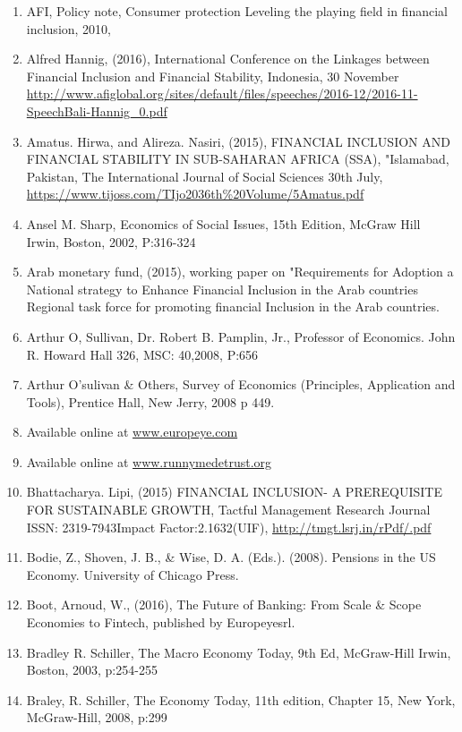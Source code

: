\documentclass[10pt,a4paper]{report}
\begin{document}
	\begin{english}
\begin{enumerate}
	\item AFI, Policy note, Consumer protection Leveling the playing field in financial inclusion, 2010,
	\item Alfred Hannig, (2016), International Conference on the Linkages between Financial Inclusion and Financial Stability, Indonesia, 30 November \url{http://www.afiglobal.org/sites/default/files/speeches/2016-12/2016-11-SpeechBali-Hannig_0.pdf}
	\item Amatus. Hirwa, and Alireza. Nasiri, (2015), FINANCIAL INCLUSION AND FINANCIAL STABILITY IN SUB-SAHARAN AFRICA (SSA), "Islamabad, Pakistan, The International Journal of Social Sciences 30th July, \url{https://www.tijoss.com/TIjo2036th%20Volume/5Amatus.pdf}
	\item Ansel M. Sharp, Economics of Social Issues, 15th Edition, McGraw Hill Irwin, Boston, 2002, P:316-324
	\item Arab monetary fund, (2015), working paper on "Requirements for Adoption a National strategy to Enhance Financial Inclusion in the Arab countries Regional task force for promoting financial Inclusion in the Arab countries.
	\item Arthur O, Sullivan, Dr. Robert B. Pamplin, Jr., Professor of Economics. John R. Howard Hall 326, MSC: 40,2008, P:656
	\item Arthur O'sulivan \& Others, Survey of Economics (Principles, Application and Tools), Prentice Hall, New Jerry, 2008 p 449.
	\item Available online at \url{www.europeye.com}
	\item Available online at \url{www.runnymedetrust.org}
	\item Bhattacharya. Lipi, (2015) FINANCIAL INCLUSION- A PREREQUISITE FOR SUSTAINABLE GROWTH, Tactful Management Research Journal ISSN: 2319-7943Impact Factor:2.1632(UIF), \url{http://tmgt.lsrj.in/rPdf/.pdf}
	\item Bodie, Z., Shoven, J. B., \& Wise, D. A. (Eds.). (2008). Pensions in the US Economy. University of Chicago Press.
	\item Boot, Arnoud, W., (2016), The Future of Banking: From Scale \& Scope Economies to Fintech, published by Europeyesrl.
	\item Bradley R. Schiller, The Macro Economy Today, 9th Ed, McGraw-Hill Irwin, Boston, 2003, p:254-255
	\item Braley, R. Schiller, The Economy Today, 11th edition, Chapter 15, New York, McGraw-Hill, 2008, p:299

\end{enumerate}
\end{english}
\end{document}
